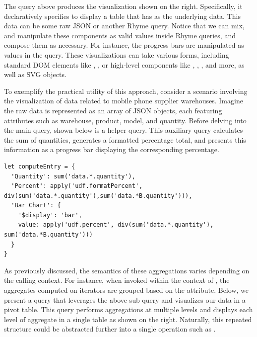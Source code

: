 \documentclass[runningheads]{llncs}
\newcommand{\lang}{Rhyme}
\begin{document}
The query above produces the visualization shown on the right.
Specifically, it declaratively specifies to display a table that
has  as the underlying data.
This data can be some raw JSON or another \lang{} query.
Notice that we can mix, and manipulate these components as valid
values inside \lang{} queries, and compose them as necessary.
For instance, the progress bars are manipulated as values in the query.
These visualizations can take various forms, including standard DOM elements
like , , or high-level components like
, , , and more,
as well as SVG objects.

To exemplify the practical utility of this approach, consider a scenario involving
the visualization of data related to mobile phone supplier warehouses.
Imagine the raw data is represented as an array of JSON objects, each featuring attributes
such as warehouse, product, model, and quantity.
Before delving into the main query, shown below is a helper query.
This auxiliary query calculates the sum of quantities, generates a formatted percentage
total, and presents this information as a progress bar displaying the corresponding percentage.

\begin{lstlisting}[style=JavaScript,columns=flexible]
let computeEntry = {
  'Quantity': sum('data.*.quantity'),
  'Percent': apply('udf.formatPercent', div(sum('data.*.quantity'),sum('data.*B.quantity'))),
  'Bar Chart': {
    '$display': 'bar',
    value: apply('udf.percent', div(sum('data.*.quantity'), sum('data.*B.quantity')))
  }
}
\end{lstlisting}

As previously discussed, the semantics of these aggregations varies depending on the
calling context.
For instance, when invoked within the context of , the
aggregates computed on \inline{*} iterators are grouped based on the  attribute.
Below, we present a query that leverages the above sub query and visualizes our data in a pivot table.
This query performs aggregations at multiple levels and displays each level of
aggregate in a single table as shown on the right.
Naturally, this repeated structure could be abstracted further into a single
operation such as .
\end{document}
